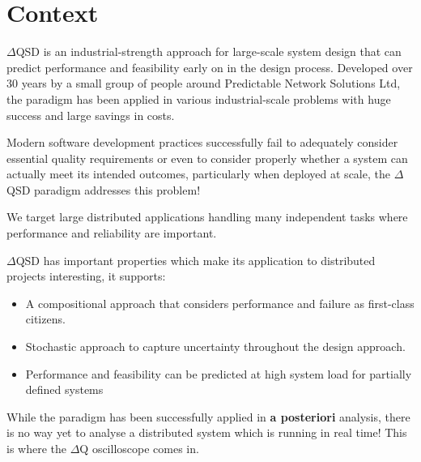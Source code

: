 \section{Context}
    $\Delta$QSD is an industrial-strength approach for large-scale system design that can predict performance and feasibility early on in the design process. 
    Developed over 30 years by a small group of people around Predictable Network Solutions Ltd, the paradigm has been applied in various industrial-scale problems with huge success and large savings in costs.

    Modern software development practices successfully fail to adequately consider essential quality requirements or even to consider properly whether a system can actually meet its intended outcomes, particularly when deployed at scale, the $\Delta$QSD paradigm addresses this problem! 
    
    We target large distributed applications handling many independent tasks where performance and reliability are important. 
    
    $\Delta$QSD has important properties which make its application to distributed projects interesting, it supports:
    \begin{itemize}
        \item A compositional approach that considers performance and failure as first-class citizens. 
        \item Stochastic approach to capture uncertainty throughout the design approach.
        \item Performance and feasibility can be predicted at high system load for partially defined systems
    \end{itemize}
    
    While the paradigm has been successfully applied in \textbf{a posteriori} analysis, there is no way yet to analyse a distributed system which is running in real time! This is where the $\Delta$Q oscilloscope comes in. 
